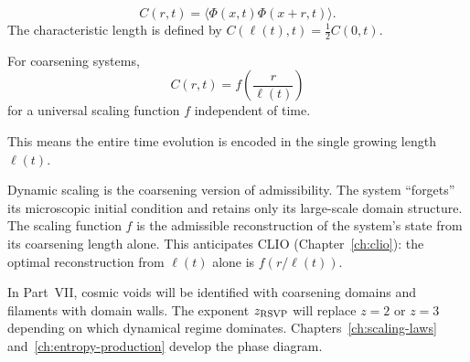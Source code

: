 \begin{definition}
  \[
    C(r,t) = \langle\Phi(x,t)\Phi(x+r,t)\rangle.
  \]
  The characteristic length is defined by
  $C(\ell(t), t) = \frac{1}{2}C(0,t)$.
\end{definition}

\begin{theorem}
  \label{thm:dynamic-scaling}
  For coarsening systems,
  \[
    C(r,t) = f\!\left(\frac{r}{\ell(t)}\right)
  \]
  for a universal scaling function $f$ independent of time.
\end{theorem}

This means the entire time evolution is encoded in the single
growing length $\ell(t)$.

\begin{AdmPreview}
  Dynamic scaling is the coarsening version of admissibility.
  The system ``forgets'' its microscopic initial condition
  and retains only its large-scale domain structure.
  The scaling function $f$ is the admissible reconstruction
  of the system's state from its coarsening length alone.
  This anticipates CLIO (Chapter~\ref{ch:clio}): the optimal
  reconstruction from $\ell(t)$ alone is $f(r/\ell(t))$.
\end{AdmPreview}

\begin{ForwardRef}
  In Part~VII, cosmic voids will be identified with coarsening
  domains and filaments with domain walls.
  The exponent $z_{\rm RSVP}$ will replace $z=2$ or $z=3$
  depending on which dynamical regime dominates.
  Chapters~\ref{ch:scaling-laws} and~\ref{ch:entropy-production}
  develop the phase diagram.
\end{ForwardRef}

\begin{ProblemSet}
\end{ProblemSet}

